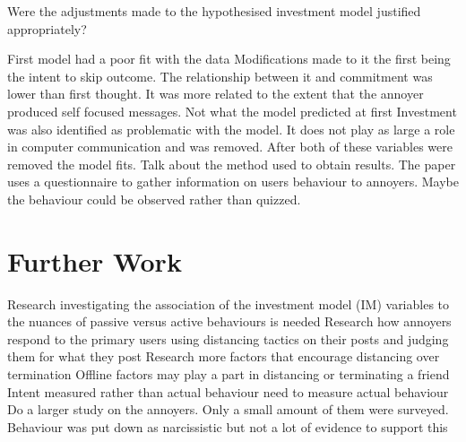 \documentclass[12pt]{article}
\begin{document}
Were the adjustments made to the hypothesised investment model justified appropriately?

First model had a poor fit with the data
Modifications made to it the first being the intent to skip outcome. The relationship between it and commitment was lower than first thought. It was more related to the extent that the annoyer produced self focused messages. Not what the model predicted at first
Investment was also identified as problematic with the model. It does not play as large a role in computer communication and was removed.
After both of these variables were removed the model fits.
Talk about the method used to obtain results. The paper uses a questionnaire to gather information on users behaviour to annoyers. Maybe the behaviour could be observed rather than quizzed. 

\section{Further Work}
Research investigating the association of the investment model (IM) variables to the nuances of passive versus active behaviours is needed
Research how annoyers respond to the primary users using distancing tactics on their posts and judging them for what they post
Research more factors that encourage distancing over termination
Offline factors may play a part in distancing or terminating a friend
Intent measured rather than actual behaviour need to measure actual behaviour
Do a larger study on the annoyers. Only a small amount of them were surveyed. Behaviour was put down as narcissistic but not a lot of evidence to support this
\cite{Carpenter}



\end{document}
